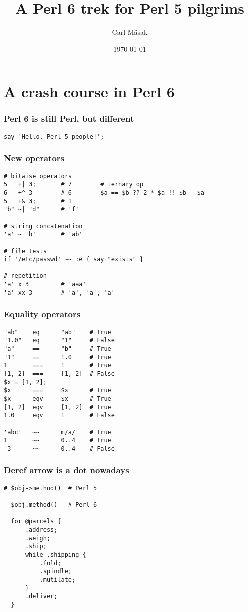 \documentclass{beamer}
\begin{document}
\title{A Perl 6 trek for Perl 5 pilgrims}
\author{Carl Mäsak}
\date{\today}

\frame{\titlepage}


\section{A crash course in Perl 6}

\begin{frame}[fragile]
\frametitle{Perl 6 is still Perl, but different}
\begin{verbatim}
say 'Hello, Perl 5 people!';
\end{verbatim}
\end{frame}

\begin{frame}[fragile]
\frametitle{New operators}
\begin{verbatim}
# bitwise operators
5   +| 3;       # 7        # ternary op
6   +^ 3        # 6        $a == $b ?? 2 * $a !! $b - $a
5   +& 3;       # 1
"b" ~| "d"      # 'f'

# string concatenation
'a' ~ 'b'       # 'ab'

# file tests
if '/etc/passwd' ~~ :e { say "exists" }

# repetition
'a' x 3         # 'aaa'
'a' xx 3        # 'a', 'a', 'a'
\end{verbatim}
\end{frame}

\begin{frame}[fragile]
\frametitle{Equality operators}
\begin{verbatim}
"ab"    eq      "ab"    # True
"1.0"   eq      "1"     # False
"a"     ==      "b"     # True
"1"     ==      1.0     # True
1       ===     1       # True
[1, 2]  ===     [1, 2]  # False
$x = [1, 2];
$x      ===     $x      # True
$x      eqv     $x      # True
[1, 2]  eqv     [1, 2]  # True
1.0     eqv     1       # False

'abc'   ~~      m/a/    # True
1       ~~      0..4    # True
-3      ~~      0..4    # False
\end{verbatim}
\end{frame}

\begin{frame}[fragile]
\frametitle{Deref arrow is a dot nowadays}
\begin{verbatim}
# $obj->method()  # Perl 5

  $obj.method()   # Perl 6

  for @parcels {
      .address;
      .weigh;
      .ship;
      while .shipping {
          .fold;
          .spindle;
          .mutilate;
      }
      .deliver;
  }
\end{verbatim}
\end{frame}
\end{document}
